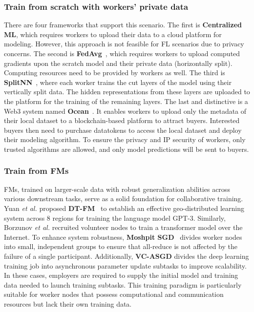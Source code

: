 \subsubsection{Train from scratch with workers' private data}
There are four frameworks that support this scenario. 
The first is \textbf{Centralized ML}, which requires workers to upload their data to a cloud platform for modeling. However, this approach is not feasible for FL scenarios due to privacy concerns. 
The second is \textbf{FedAvg}~\cite{mcmahan2017communication}, which requires workers to upload computed gradients upon the scratch model and their private data (horizontally split). Computing resources need to be provided by workers as well.
The third is \textbf{SplitNN}~\cite{vepakomma2019split}, where each worker trains the cut layers of the model using their vertically split data. 
The hidden representations from these layers are uploaded to the platform for the training of the remaining layers.
The last and distinctive is a Web3 system named \textbf{Ocean}~\cite{mcconaghy2022ocean}.
It enables workers to upload only the metadata of their local dataset to a blockchain-based platform to attract buyers. 
Interested buyers then need to purchase datatokens to access the local dataset and deploy their modeling algorithm. 
To ensure the privacy and IP security of workers, only trusted algorithms are allowed, and only model predictions will be sent to buyers.

\subsubsection{Train from FMs}
FMs, trained on larger-scale data with robust generalization abilities across various downstream tasks, serve as a solid foundation for collaborative training. 
Yuan \textit{et al.} proposed \textbf{DT-FM}~\cite{yuan2022decentralized} to establish an effective geo-distributed learning system across 8 regions for training the language model GPT-3.
Similarly, Borzunov \textit{et al.}\cite{borzunov2022training} recruited volunteer nodes to train a transformer model over the Internet. 
To enhance system robustness, \textbf{Moshpit SGD}~\cite{ryabinin2021moshpit} divides worker nodes into small, independent groups to ensure that all-reduce is not affected by the failure of a single participant.
Additionally, \textbf{VC-ASGD}\cite{atre2021distributed} divides the deep learning training job into asynchronous parameter update subtasks to improve scalability.
In these cases, employers are required to supply the initial model and training data needed to launch training subtasks. 
This training paradigm is particularly suitable for worker nodes that possess computational and communication resources but lack their own training data.


